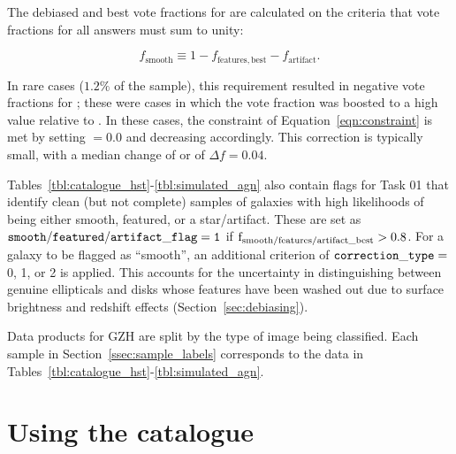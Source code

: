 \documentclass[a4paper,fleqn,usenatbib]{mnras}
\begin{document}
The debiased and best vote fractions for \fsmooth{} are calculated on the
criteria that vote fractions for all answers must sum to unity:

\begin{equation}
f_\mathrm{smooth} \equiv 1 - f_\mathrm{features,best} - f_\mathrm{artifact}.
\label{eqn:constraint}
\end{equation}

\noindent In rare cases ($1.2\%$ of the \main{} sample), this requirement resulted in
negative vote fractions for \fsmooth; these were cases in which the
\ffeatures{} vote fraction was boosted to a high value relative to \fartifact.
In these cases, the constraint of Equation~\ref{eqn:constraint} is met by
setting \fsmooth$=0.0$ and decreasing \fbest{} accordingly. This correction is
typically small, with a median change of
\ffeatures{} or \fsmooth{} of $\Delta f = 0.04$.

Tables~\ref{tbl:catalogue_hst}-\ref{tbl:simulated_agn} also contain flags for
Task 01 that identify clean (but not complete) samples of galaxies with high
likelihoods of being either smooth, featured, or a star/artifact.  These are
set as $\tt smooth/featured/artifact\_flag=1$ if $\rm
f_{smooth/features/artifact\_best}>0.8$. For a galaxy to be flagged as
``smooth'', an additional criterion of $\tt correction\_type =~$0, 1, or 2 is
applied. This accounts for the uncertainty in distinguishing between genuine
ellipticals and disks whose features have been washed out due to surface
brightness and redshift effects (Section~\ref{sec:debiasing}).

Data products for GZH are split by the type of image being classified. Each
sample in Section~\ref{ssec:sample_labels} corresponds to the data in
Tables~\ref{tbl:catalogue_hst}-\ref{tbl:simulated_agn}.

\clearpage




\clearpage



\clearpage

\section{Using the catalogue}\label{sec:cookbook}
\end{document}
